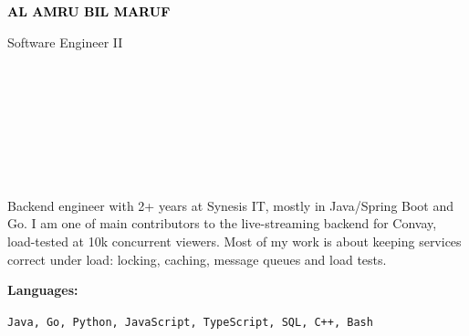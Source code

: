 \documentclass[9pt]{developercv}
\begin{document}
\begin{minipage}[t]{0.42\textwidth}
	\vspace{-\baselineskip} 
	
	{ \fontsize{16}{20} \textcolor{black}{\textbf{\MakeUppercase{Al Amru Bil Maruf}}}}
	
	\vspace{6pt}
	
	{\Large Software Engineer II} 
\end{minipage}
\hfill
\begin{minipage}[t]{0.2\textwidth} 
	\vspace{-\baselineskip} 
	
     \\
     \\
     \\
	
\end{minipage}
\begin{minipage}[t]{0.33\textwidth}
	\vspace{-\baselineskip}
	
	 \\	
     \\
     \\
    
\end{minipage}

Backend engineer with 2+ years at Synesis IT, mostly in Java/Spring Boot and Go. I am one of main contributors to the live-streaming backend for Convay, load-tested at 10k concurrent viewers. Most of my work is about keeping services correct under load: locking, caching, message queues and load tests.

\vspace{-6pt}

\begin{minipage}[t]{0.2\textwidth}
    \textbf{Languages:}
\end{minipage}
\hfill
\begin{minipage}[t]{0.8\textwidth}
  {\large \texttt{Java, Go, Python, JavaScript, TypeScript, SQL, C++, Bash}}
\end{minipage}
\end{document}
